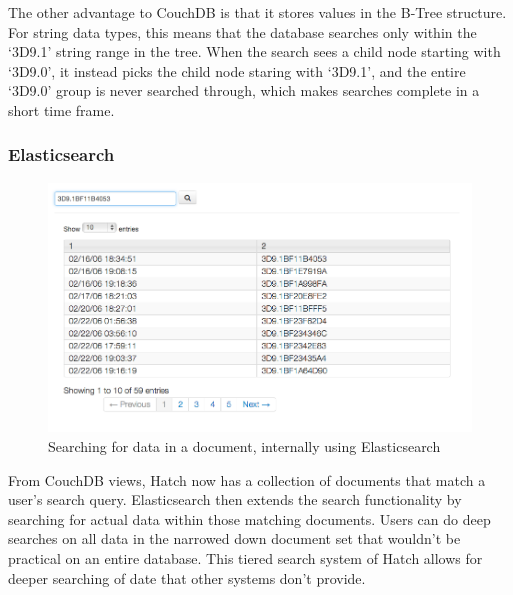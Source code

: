 The other advantage to CouchDB is that it stores values in the B-Tree structure. For
string data types, this means that the database searches only within the `3D9.1' string range
in the tree. When the search sees a child node starting with `3D9.0', it instead picks
the child node staring with `3D9.1', and the entire `3D9.0' group is never searched 
through, which makes searches complete in a short time frame.

\subsubsection{Elasticsearch}

\begin{figure}[h]
	\begin{center}
	\includegraphics[width=120mm]{images/demo_search_02}
	\caption{Searching for data in a document, internally using Elasticsearch} 
	\label{demo_search_02}
	\end{center}
\end{figure}

From CouchDB views, Hatch now has a collection of documents that match a user's search
query. Elasticsearch then extends the search functionality by searching for actual data
within those matching documents. Users can do deep searches on all data in the narrowed
down document set that wouldn't be practical on an entire database. This tiered
search system of Hatch allows for deeper searching of date that other systems don't
provide.
